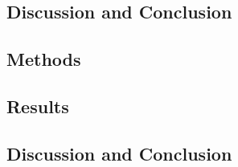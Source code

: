         \subsection{Discussion and Conclusion} \label{extension_of_static_pca_based_data_driven_surrogate_signal_extraction_to_dynamic_pet_discussion_and_conclusion}
            \blindtext
    
        \blindtext
        
        \subsection{Methods} \label{feasibility_of_neural_network_based_data_driven_surrogate_signal_extraction_methods_for_dynamic_pet_methods}
            \blindtext
            
        \subsection{Results} \label{feasibility_of_neural_network_based_data_driven_surrogate_signal_extraction_methods_for_dynamic_pet_results}
            \blindtext
            
        \subsection{Discussion and Conclusion} \label{feasibility_of_neural_network_based_data_driven_surrogate_signal_extraction_methods_for_dynamic_pet_discussion_and_conclusion}
            \blindtext
